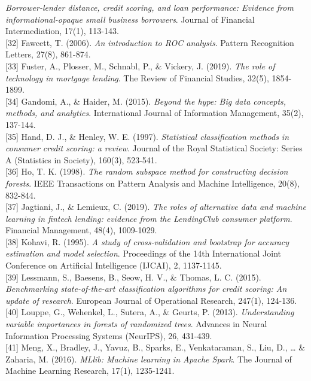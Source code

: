 \documentclass[
  13pt,
  a4paper,
]{report}
\begin{document}
\emph{Borrower-lender distance, credit scoring, and loan performance:
Evidence from informational-opaque small business borrowers}. Journal of
Financial Intermediation, 17(1), 113-143.\\
{[}32{]} Fawcett, T. (2006). \emph{An introduction to ROC analysis}.
Pattern Recognition Letters, 27(8), 861-874.\\
{[}33{]} Fuster, A., Plosser, M., Schnabl, P., \& Vickery, J. (2019).
\emph{The role of technology in mortgage lending}. The Review of
Financial Studies, 32(5), 1854-1899.\\
{[}34{]} Gandomi, A., \& Haider, M. (2015). \emph{Beyond the hype: Big
data concepts, methods, and analytics}. International Journal of
Information Management, 35(2), 137-144.\\
{[}35{]} Hand, D. J., \& Henley, W. E. (1997). \emph{Statistical
classification methods in consumer credit scoring: a review}. Journal of
the Royal Statistical Society: Series A (Statistics in Society), 160(3),
523-541.\\
{[}36{]} Ho, T. K. (1998). \emph{The random subspace method for
constructing decision forests}. IEEE Transactions on Pattern Analysis
and Machine Intelligence, 20(8), 832-844.\\
{[}37{]} Jagtiani, J., \& Lemieux, C. (2019). \emph{The roles of
alternative data and machine learning in fintech lending: evidence from
the LendingClub consumer platform}. Financial Management, 48(4),
1009-1029.\\
{[}38{]} Kohavi, R. (1995). \emph{A study of cross-validation and
bootstrap for accuracy estimation and model selection}. Proceedings of
the 14th International Joint Conference on Artificial Intelligence
(IJCAI), 2, 1137-1145.\\
{[}39{]} Lessmann, S., Baesens, B., Seow, H. V., \& Thomas, L. C.
(2015). \emph{Benchmarking state-of-the-art classification algorithms
for credit scoring: An update of research}. European Journal of
Operational Research, 247(1), 124-136.\\
{[}40{]} Louppe, G., Wehenkel, L., Sutera, A., \& Geurts, P. (2013).
\emph{Understanding variable importances in forests of randomized
trees}. Advances in Neural Information Processing Systems (NeurIPS), 26,
431-439.\\
{[}41{]} Meng, X., Bradley, J., Yavuz, B., Sparks, E., Venkataraman, S.,
Liu, D., \ldots{} \& Zaharia, M. (2016). \emph{MLlib: Machine learning
in Apache Spark}. The Journal of Machine Learning Research, 17(1),
1235-1241.\\
\end{document}
